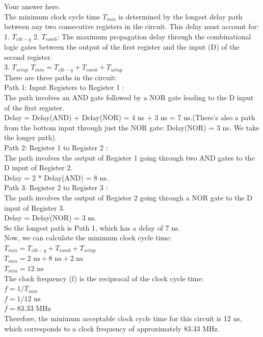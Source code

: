 \documentclass[a4paper]{article}
\begin{document}
\begin{answer}[Question 2]
        Your answer here. \\
        The minimum clock cycle time $T_{min}$ is determined by the longest delay path between any two consecutive registers in the circuit. This delay must account for:\\
        1. $T_{clk-q}$ 
        2. $T_{comb}$: The maximum propagation delay through the combinational logic gates between the output of the first register and the input (D) of the second register.\\
        3. $T_{setup}$
        $T_{min} = T_{clk-q} + T_{comb} + T_{setup}$\\
        There are three paths in the circuit: \\
        Path 1: Input Registers to Register 1 :\\
        The path involves an AND gate followed by a NOR gate leading to the D input of the first register.\\
        Delay = Delay(AND) + Delay(NOR) = 4 ns + 3 ns = 7 ns.(There's also a path from the bottom input through just the NOR gate: Delay(NOR) = 3 ns. We take the longer path).\\
        Path 2: Register 1 to Register 2 :\\
        The path involves the output of Register 1 going through two AND gates to the D input of Register 2.\\
        Delay = 2 * Delay(AND) = 8 ns. \\
        Path 3: Register 2 to Register 3 :\\
        The path involves the output of Register 2 going through a NOR gate to the D input of Register 3.\\
        Delay = Delay(NOR) = 3 ns. \\
        So the longest path is Path 1, which has a delay of 7 ns.\\
        Now, we can calculate the minimum clock cycle time: \\
        $T_{min} = T_{clk-q} + T_{comb} + T_{setup}$\\
        $T_{min} = 2 \text{ ns} + 8 \text{ ns} + 2 \text{ ns}$\\
        $T_{min} = 12 \text{ ns}$\\
        The clock frequency (f) is the reciprocal of the clock cycle time: \\
        $f = 1 / T_{min}$\\
        $f = 1 / 12 \text{ ns}$\\
        $f = 83.33 \text{ MHz}$\\
        Therefore, the minimum acceptable clock cycle time for this circuit is 12 ns, which corresponds to a clock frequency of approximately 83.33 MHz.

\end{answer}
\end{document}
